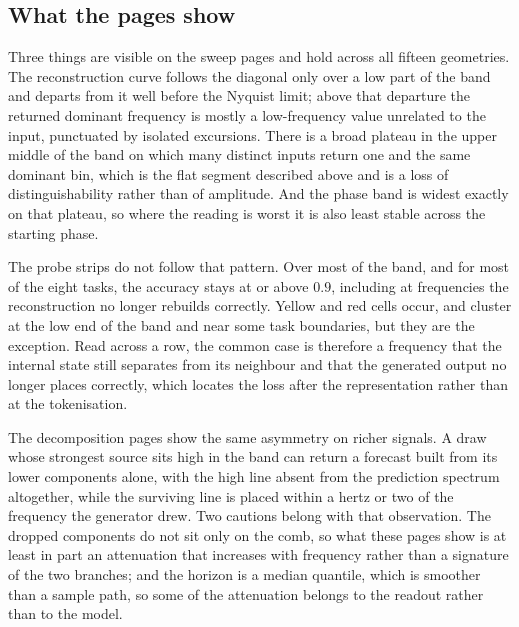 \subsection{What the pages show}

Three things are visible on the sweep pages and hold across all fifteen geometries. The reconstruction curve follows the diagonal only over a low part of the band and departs from it well before the Nyquist limit; above that departure the returned dominant frequency is mostly a low-frequency value unrelated to the input, punctuated by isolated excursions. There is a broad plateau in the upper middle of the band on which many distinct inputs return one and the same dominant bin, which is the flat segment described above and is a loss of distinguishability rather than of amplitude. And the phase band is widest exactly on that plateau, so where the reading is worst it is also least stable across the starting phase.

The probe strips do not follow that pattern. Over most of the band, and for most of the eight tasks, the accuracy stays at or above $0.9$, including at frequencies the reconstruction no longer rebuilds correctly. Yellow and red cells occur, and cluster at the low end of the band and near some task boundaries, but they are the exception. Read across a row, the common case is therefore a frequency that the internal state still separates from its neighbour and that the generated output no longer places correctly, which locates the loss after the representation rather than at the tokenisation.

The decomposition pages show the same asymmetry on richer signals. A draw whose strongest source sits high in the band can return a forecast built from its lower components alone, with the high line absent from the prediction spectrum altogether, while the surviving line is placed within a hertz or two of the frequency the generator drew. Two cautions belong with that observation. The dropped components do not sit only on the comb, so what these pages show is at least in part an attenuation that increases with frequency rather than a signature of the two branches; and the horizon is a median quantile, which is smoother than a sample path, so some of the attenuation belongs to the readout rather than to the model.

